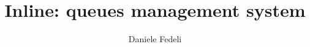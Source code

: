 \documentclass[Lau,binding=0.6cm]{sapthesis}
\title{Inline: queues management system}
\author{Daniele Fedeli}
\begin{document}
	
	\frontmatter
	
	\maketitle
	
	\dedication{"Il computer non è una macchina intelligente che aiuta le persone stupide, anzi, è una macchina stupida che funziona solo nelle mani delle persone intelligenti."	
	Umberto Eco}

	{\tableofcontents}
	\listoffigures
	\listoftables
	\mainmatter

	
	
	
	
	
	
	
	\backmatter
	\cleardoublepage
	
\end{document}
